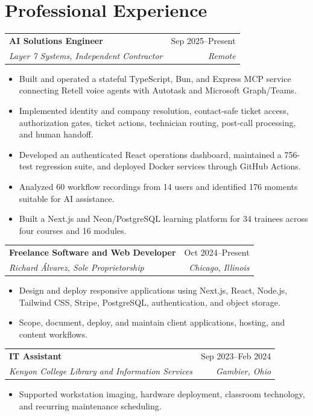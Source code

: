 \documentclass[letterpaper,11pt]{article}
\makeatletter
\newcommand{\cventry}[4]{
  \Needspace{9\baselineskip}
  \begin{tabularx}{\textwidth}{@{}X@{\hspace{1em}}r@{}}
    #1 & #2 \\
    \textit{#3} & \textit{#4}
  \end{tabularx}
}
\newenvironment{cvitems}
  {\begin{itemize}[label={},leftmargin=0pt,itemindent=0pt,itemsep=4pt,topsep=4pt,parsep=0pt,partopsep=0pt]}
  {\end{itemize}\vspace{3pt}}
\makeatother
\begin{document}
\section{Professional Experience}
\cventry
  {\textbf{AI Solutions Engineer}}
  {Sep 2025--Present}
  {Layer 7 Systems, Independent Contractor}
  {Remote}
\begin{cvitems}
  \item Built and operated a stateful TypeScript, Bun, and Express MCP service connecting Retell voice agents with Autotask and Microsoft Graph/Teams.
  \item Implemented identity and company resolution, contact-safe ticket access, authorization gates, ticket actions, technician routing, post-call processing, and human handoff.
  \item Developed an authenticated React operations dashboard, maintained a 756-test regression suite, and deployed Docker services through GitHub Actions.
  \item Analyzed 60 workflow recordings from 14 users and identified 176 moments suitable for AI assistance.
  \item Built a Next.js and Neon/PostgreSQL learning platform for 34 trainees across four courses and 16 modules.
\end{cvitems}

\cventry
  {\textbf{Freelance Software and Web Developer}}
  {Oct 2024--Present}
  {Richard Álvarez, Sole Proprietorship}
  {Chicago, Illinois}
\begin{cvitems}
  \item Design and deploy responsive applications using Next.js, React, Node.js, Tailwind CSS, Stripe, PostgreSQL, authentication, and object storage.
  \item Scope, document, deploy, and maintain client applications, hosting, and content workflows.
\end{cvitems}

\cventry
  {\textbf{IT Assistant}}
  {Sep 2023--Feb 2024}
  {Kenyon College Library and Information Services}
  {Gambier, Ohio}
\begin{cvitems}
  \item Supported workstation imaging, hardware deployment, classroom technology, and recurring maintenance scheduling.
\end{cvitems}

\newpage
\end{document}
